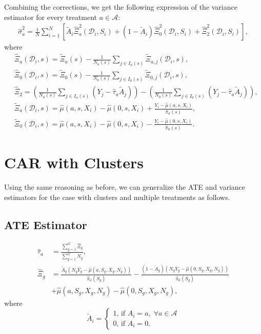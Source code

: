 \documentclass{article}
\begin{document}
Combining the corrections, we get the following expression of the variance estimator for every treatment $a \in \mathcal A$:
\begin{align}
	\hat{\sigma}_a^2 = \frac{1}{N} \sum_{i=1}^N \left[\tilde{A}_i\hat{\Xi}_{a}^2(\mathcal D_i, S_i) + (1-\tilde{A}_i) \hat{\Xi}_{0}^2(\mathcal D_i, S_i) + \hat{\Xi}_2^2(\mathcal D_i, S_i)\right], \nonumber
\end{align}
where 
\begin{align}
	&\hat{\Xi}_{a}(\mathcal D_i, s) = \tilde{\Xi}_{a}(s) - \frac{1}{N_a(s)} \sum_{j \in I_a(s)} \tilde{\Xi}_{a,j}(\mathcal D_i, s) \nonumber, \\
	&\hat{\Xi}_{0}(\mathcal D_i, s) = \tilde{\Xi}_{0}(s) - \frac{1}{N_0(s)} \sum_{j \in I_0(s)} \tilde{\Xi}_{0,j}(\mathcal D_i, s) \nonumber , \\
	& \hat{\Xi}_2 = \left(\frac{1}{N_a(s)} \sum_{j \in I_a(s)} (Y_j - \hat{\tau}_a \tilde{A}_j) \right) - \left(\frac{1}{N_0(s)} \sum_{j \in I_0(s)} (Y_j - \hat{\tau}_a  \tilde{A}_j)\right), \nonumber \\
	& \tilde{\Xi}_a(\mathcal D_i,s) = \hat{\mu}(a,s,X_i) - \hat{\mu}(0,s,X_i) + \frac{Y_i - \hat{\mu}(a,s,X_i)}{\hat{\pi}_a(s)}, \nonumber \\
& \tilde{\Xi}_0(\mathcal D_i,s) = \hat{\mu}(a,s,X_i) - \hat{\mu}(0,s,X_i) - \frac{Y_i - \hat{\mu}(0,s,X_i)}{\hat{\pi}_0(s)}. \nonumber
	\end{align}

\section{CAR with Clusters}

Using the same reasoning as before, we can generalize the ATE and variance estimators for the case with clusters and multiple treatments as follows.
\subsection*{ATE Estimator}
\begin{align}
\hat{\tau}_a &= \frac{\sum_{g=1}^G \hat{\Xi}_g}{\sum_{g=1}^G N_g}, \nonumber \\
\hat{\Xi}_g &= \frac{\tilde{A}_g \left(N_g\bar{Y}_g - \hat{\mu}(a,S_g,X_g,N_g)\right)}{\hat{\pi}_a(S_g)} - \frac{(1 - \tilde{A}_g) \left(N_g\bar{Y}_g - \hat{\mu}(0,S_g,X_g,N_g)\right)}{\hat{\pi}_0(S_g)}\nonumber \\
 &+ \hat{\mu}(a,S_g,X_g,N_g) - \hat{\mu}(0,S_g,X_g,N_g), \nonumber
\end{align}
where 
\[\tilde{A}_i = \begin{cases}1\text{, if }A_i = a, \; \forall a \in \mathcal{A} \\ 0\text{, if }A_i = 0.\end{cases}\]
\end{document}
